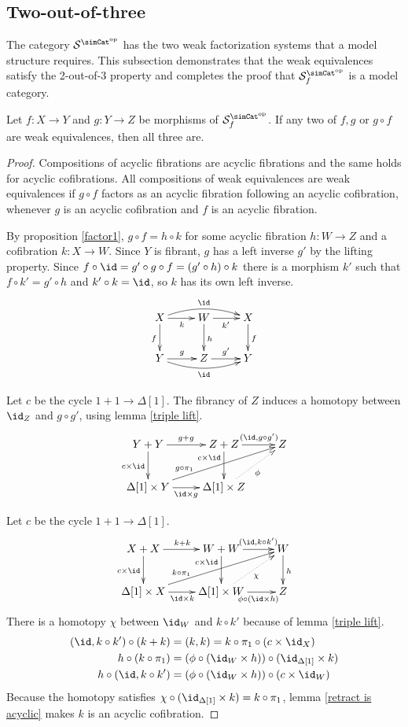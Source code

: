 \documentclass{tac}
\newcommand\cat\mathcal
\newcommand\dual{^{\mathrm{op}}}
\newcommand\s{^{\simCat\dual}}
\newcommand\of{:}
\newcommand\simplex\Delta
\newcommand\f{_f}
\begin{document}
\subsection{Two-out-of-three}
The category $\cat S\s$ has the two weak factorization systems that a model structure requires. This subsection demonstrates that the weak equivalences satisfy the 2-out-of-3 property and completes the proof that $\cat S\s\f$ is a model category.

\begin{lemma}[2-out-of-3] Let $f\of X\to Y$ and $g\of Y\to Z$ be morphisms of $\cat S\s\f$. If any two of $f,g$ or $g\circ f$ are weak equivalences, then all three are. \label{toot}\end{lemma}

\begin{proof}
Compositions of acyclic fibrations are acyclic fibrations and the same holds for acyclic cofibrations. All compositions of weak equivalences are weak equivalences if $g\circ f$ factors as an acyclic fibration following an acyclic cofibration, whenever $g$ is an acyclic cofibration and $f$ is an acyclic fibration.

By proposition \ref{factor1}, $g\circ f=h\circ k$ for some acyclic fibration $h\of W\to Z$ and a cofibration $k\of X\to W$. Since $Y$ is fibrant, $g$ has a left inverse $g'$ by the lifting property. Since $f \circ \id = g'\circ g\circ f= (g'\circ h)\circ k$ there is a morphism $k'$ such that $f\circ k' = g'\circ h$ and $k'\circ k = \id$, so $k$ has its own left inverse.
\[\xymatrix{
X\ar[d]_f \ar[r]_{k} \ar@/^2ex/[rr]^{\id} & W\ar[d]^h \ar[r]_{k'} & X\ar[d]^f\\
Y \ar[r]^{g} \ar@/_2ex/[rr]_{\id} & Z \ar[r]^{g'} & Y
}\]

Let $c$ be the cycle $1+1\to\simplex[1]$. The fibrancy of $Z$ induces a homotopy between $\id_Z$ and $g\circ g'$, using lemma \ref{triple lift}.
\[\xymatrix{
Y+Y\ar[r]^{g+g}\ar[d]_{c\times\id} & Z+Z\ar[r]^(.6){(\id,g\circ g')}\ar[d]_(.3){c\times\id} & Z\\
\simplex[1]\times Y\ar[r]_{\id\times g}\ar[urr]^(.3){g\circ\pi_1} & \simplex[1]\times Z\ar@{.>}[ur]_{\phi}
}\]

Let $c$ be the cycle $1+1\to\simplex[1]$. 
\[\xymatrix{
X+X\ar[d]_{c\times \id}\ar[r]^{k+k} & W+W\ar[d]_(.3){c\times \id}\ar[r]^(.6){(\id,k\circ k')} & W\ar[d]^h\\
\simplex[1]\times X\ar[r]_{\id\times k} \ar[urr]^(.3){k\circ \pi_1}  & \simplex[1]\times W\ar[r]_(.6){\phi\circ (\id\times h)} \ar@{.>}[ur]_\chi & Z
}\]
There is a homotopy $\chi$ between $\id_W$ and $k\circ k'$ because of lemma \ref{triple lift}.
\begin{align*}
(\id, k\circ k')\circ (k+k) &= (k,k) = k\circ \pi_1\circ(c\times\id_X)\\
h\circ (k \circ \pi_1) &= (\phi\circ (\id_W\times h))\circ (\id_{\simplex[1]} \times k)\\
h\circ (\id, k\circ k') &= (\phi\circ (\id_W\times h))\circ (c\times \id_W)
\end{align*}
Because the homotopy satisfies $\chi\circ(\id_{\simplex[1]}\times k) = k\circ \pi_1$, lemma \ref{retract is acyclic} makes $k$ is an acyclic cofibration.


\end{proof}
\end{document}

